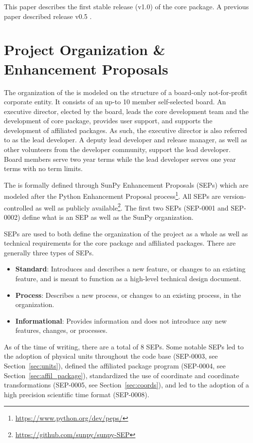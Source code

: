 This paper describes the first stable release (v1.0) of the core package.
A previous paper described release v0.5 \citep{Community:2015cy}.

\section{Project Organization \& Enhancement Proposals}

The organization of the \sunpyproj is modeled on the structure of a board-only not-for-profit corporate entity.
It consists of an up-to 10 member self-selected board.
An executive director, elected by the board, leads the core development team and the development of \sunpypkg core package, provides user support, and supports the development of affiliated packages.
As such, the executive director is also referred to as the lead developer.
A deputy lead developer and release manager, as well as other volunteers from the developer community, support the lead developer.
Board members serve two year terms while the lead developer serves one year terms with no term limits.

The \sunpyproj is formally defined through SunPy Enhancement Proposals (SEPs) which are modeled after the Python Enhancement Proposal process\footnote{\url{https://www.python.org/dev/peps/}}.
All SEPs are version-controlled as well as publicly available\footnote{\url{https://github.com/sunpy/sunpy-SEP}}.
The first two SEPs (SEP-0001 and SEP-0002) define what is an SEP as well as the SunPy organization.

SEPs are used to both define the organization of the project as a whole as well as technical requirements for the \sunpypkg core package and affiliated packages.
There are generally three types of SEPs.
\begin{itemize}
    \item \textbf{Standard}: Introduces and describes a new feature, or changes to an existing feature, and is meant to function as a high-level technical design document.
    \item \textbf{Process}: Describes a new process, or changes to an existing process, in the organization.
    \item \textbf{Informational}: Provides information and does not introduce any new features, changes, or processes.
\end{itemize}

As of the time of writing, there are a total of 8 SEPs.
Some notable SEPs led to the adoption of physical units throughout the code base (SEP-0003, see Section~\ref{sec:units}), defined the affiliated package program (SEP-0004, see Section~\ref{sec:affil_package}), standardized the use of coordinate and coordinate transformations (SEP-0005, see Section~\ref{sec:coords}), and led to the adoption of a high precision scientific time format (SEP-0008).

